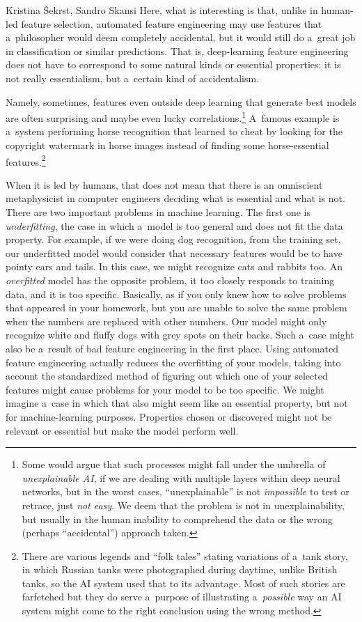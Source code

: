 \begin{artengenv2auth}{Kristina Šekrst, Sandro Skansi}
Here, what is interesting is that, unlike in human-led feature selection, automated feature engineering may use features that a~philosopher would deem completely accidental, but it would still do a~great job in classification or similar predictions. That is, deep-learning feature engineering does not have to correspond to some natural kinds or essential properties: it is not really essentialism, but a~certain kind of accidentalism.

Namely, sometimes, features even outside deep learning that generate best models are often surprising and maybe even lucky correlations.\footnote{Some would argue that such processes might fall under the umbrella of \textit{unexplainable AI}, if we are dealing with multiple layers within deep neural networks, but in the worst cases, ``unexplainable'' is not \textit{impossible} to test or retrace, just \textit{not easy}. We deem that the problem is not in unexplainability, but usually in the human inability to comprehend the data or the wrong (perhaps ``accidental'') approach taken.} A~famous example is a~system
\parencite[][]{lapuschkin_unmasking_2019} %
 performing horse recognition that learned to cheat by looking for the copyright watermark in horse images instead of finding some horse-essential features.\footnote{There are various legends and ``folk tales'' stating variations of a~tank story, in which Russian tanks were photographed during daytime, unlike British tanks, so the AI system used that to its advantage. Most of such stories are farfetched but they do serve a~purpose of illustrating a~\textit{possible} way an AI system might come to the right conclusion using the wrong method.}

When it is led by humans, that does not mean that there is an omniscient metaphysicist in computer engineers deciding what is essential and what is not. There are two important problems in machine learning. The first one is \textit{underfitting}, the case in which a~model is too general and does not fit the data property. For example, if we were doing dog recognition, from the training set, our underfitted model would consider that necessary features would be to have pointy ears and tails. In this case, we might recognize cats and rabbits too. An \textit{overfitted} model has the opposite problem, it too closely responds to training data, and it is too specific. Basically, as if you only knew how to solve problems that appeared in your homework, but you are unable to solve the same problem when the numbers are replaced with other numbers. Our model might only recognize white and fluffy dogs with grey spots on their backs. Such a~case might also be a~result of bad feature engineering in the first place. Using automated feature engineering actually reduces the overfitting of your models, taking into account the standardized method of figuring out which one of your selected features might cause problems for your model to be too specific. We might imagine a~case in which that also might seem like an essential property, but not for machine-learning purposes. Properties chosen or discovered might not be relevant or essential but make the model perform well.


\end{artengenv2auth}
